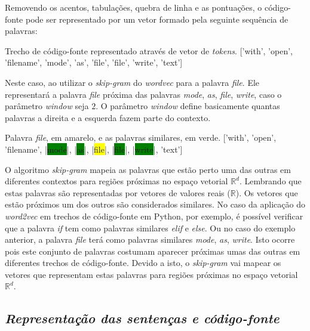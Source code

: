 Removendo os acentos, tabulações, quebra de linha e as pontuações, o código-fonte pode ser representado por um vetor formado pela seguinte sequência de palavras:

\begin{mypythonembedding}{Trecho de código-fonte representado através de vetor de \textit{tokens}.}
  ['with', 'open', 'filename', 'mode', 'as', 'file', 'file', 'write', 'text']
\end{mypythonembedding}

Neste caso, ao utilizar o \textit{skip-gram} do \textit{wordvec} para a palavra \emph{file}. Ele representará a palavra \emph{file} próxima das palavras \emph{mode}, \emph{as}, \emph{file}, \emph{write}, caso o parâmetro \textit{window} seja $2$. O parâmetro \textit{window} define basicamente quantas palavras a direita e a esquerda fazem parte do contexto.

\begin{mypythonembedding}{Palavra \textit{file}, em amarelo, e as palavras similares, em verde.}
  ['with', 'open', 'filename', |\colorbox{green}{mode}|, |\colorbox{green}{as}|, |\colorbox{yellow}{file}|, |\colorbox{green}{file}|, |\colorbox{green}{write}|, 'text']
\end{mypythonembedding}

O algoritmo \textit{skip-gram} mapeia as palavras que estão perto uma das outras em diferentes contextos para regiões próximas no espaço vetorial $\mathbb{R}^{d}$. Lembrando que estas palavras são representadas por vetores de valores reais ($\mathbb{R}$). Os vetores que estão próximos um dos outros são considerados similares. No caso da aplicação do \textit{word2vec} em trechos de código-fonte em Python, por exemplo, é possível verificar que a palavra \emph{if} tem como palavras similares \emph{elif} e \emph{else}. Ou no caso do exemplo anterior, a palavra \emph{file} terá como palavras similares \emph{mode}, \emph{as}, \emph{write}. Isto ocorre pois este conjunto de palavras costumam aparecer próximas umas das outras em diferentes trechos de código-fonte. Devido a isto, o \textit{skip-gram} vai mapear os vetores que representam estas palavras para regiões próximas no espaço vetorial $\mathbb{R}^{d}$.


\subsection{\textit{Representação das sentenças e código-fonte}}
\label{sec:representacao-das-sentencas-fundamentacao-teorica}


